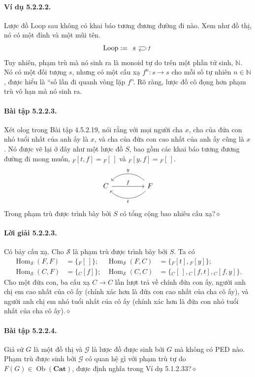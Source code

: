 \paragraph{Ví dụ 5.2.2.2.} Lược đồ $\mathrm{Loop}$ sau không có khai báo tương đương đường đi nào. Xem như đồ thị, nó có một đỉnh và một mũi tên.
\[\mathrm{Loop}:=\begin{tikzcd}s\arrow[loop right,"f"]\end{tikzcd}\]
Tuy nhiên, phạm trù mà nó sinh ra là monoid tự do trên một phần tử sinh, $\mathbb N$. Nó có một đối tượng $s$, nhưng có một cấu xạ $f^n:s\to s$ cho mỗi số tự nhiên $n\in\mathbb N$, được hiểu là ``số lần đi quanh vòng lặp $f$''. Rõ ràng, lược đồ cô đọng hơn phạm trù vô hạn mà nó sinh ra.
\paragraph{Bài tập 5.2.2.3.} Xét olog trong Bài tập 4.5.2.19, nói rằng với mọi người cha $x$, cha của đứa con nhỏ tuổi nhất của anh ấy là $x$, và cha của đứa con cao nhất của anh ấy cũng là $x$. Nó được vẽ lại ở đây như một lược đồ $S$, bao gồm các khai báo tương đương đường đi mong muốn, ${}_{F}[t,f]={}_{F}[\,]$ và ${}_{F}[y,f]={}_{F}[\,]$.
\[\begin{tikzcd}[column sep=huge]C\arrow[r,"f"]&F\arrow[l,bend left=45,"t"]\arrow[l,bend right=45,"y"']\end{tikzcd}\]
Trong phạm trù được trình bày bởi $S$ có tổng cộng bao nhiêu cấu xạ?\hfill$\diamond$
\paragraph{Lời giải 5.2.2.3.} Có bảy cấu xạ. Cho $\mathcal S$ là phạm trù được trình bày bởi $S$. Ta có
\[\begin{aligned}
\operatorname{Hom}_{\mathcal S}(F,F)&=\{{}_{F}[\,]\}; &\operatorname{Hom}_{\mathcal S}(F,C)&=\{{}_{F}[t],{}_{F}[y]\};\\
\operatorname{Hom}_{\mathcal S}(C,F)&=\{{}_{C}[f]\}; &\operatorname{Hom}_{\mathcal S}(C,C)&=\{{}_{C}[\,],{}_{C}[f,t],{}_{C}[f,y]\}.
\end{aligned}\]
Cho một đứa con, ba cấu xạ $C\to C$ lần lượt trả về chính đứa con ấy, người anh chị em cao nhất của cô ấy (chính xác hơn là đứa con cao nhất của cha cô ấy), và người anh chị em nhỏ tuổi nhất của cô ấy (chính xác hơn là đứa con nhỏ tuổi nhất của cha cô ấy).\hfill$\diamond$
\paragraph{Bài tập 5.2.2.4.} Giả sử $G$ là một đồ thị và $\mathcal G$ là lược đồ được sinh bởi $G$ mà không có PED nào. Phạm trù được sinh bởi $\mathcal G$ có quan hệ gì với phạm trù tự do $F(G)\in\operatorname{Ob}(\mathbf{Cat})$, được định nghĩa trong Ví dụ 5.1.2.33?\hfill$\diamond$
